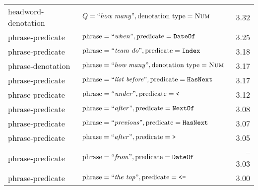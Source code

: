 \begin{tabular}{llr}
headword-denotation & $Q = \text{``\emph{how many}''}, \text{denotation type} = \textsc{Num}$ & 3.32 \\
phrase-predicate & $\text{phrase} = \text{``\emph{when}''}, \text{predicate} = {\texttt{Date}}\texttt{Of}$ & 3.25 \\
phrase-predicate & $\text{phrase} = \text{``\emph{team do}''}, \text{predicate} = \texttt{Index}$ & 3.18 \\
phrase-denotation & $\text{phrase} = \text{``\emph{how many}''}, \text{denotation type} = \textsc{Num}$ & 3.17 \\
phrase-predicate & $\text{phrase} = \text{``\emph{list before}''}, \text{predicate} = \texttt{Has}{\texttt{Next}}$ & 3.17 \\
phrase-predicate & $\text{phrase} = \text{``\emph{under}''}, \text{predicate} = \texttt{<}$ & 3.12 \\
phrase-predicate & $\text{phrase} = \text{``\emph{after}''}, \text{predicate} = {\texttt{Next}}\texttt{Of}$ & 3.08 \\
phrase-predicate & $\text{phrase} = \text{``\emph{previous}''}, \text{predicate} = \texttt{Has}{\texttt{Next}}$ & 3.07 \\
phrase-predicate & $\text{phrase} = \text{``\emph{after}''}, \text{predicate} = \texttt{>}$ & 3.05 \\
phrase-predicate & $\text{phrase} = \text{``\emph{from}''}, \text{predicate} = {\texttt{Date}}\texttt{Of}$ & --3.03 \\
phrase-predicate & $\text{phrase} = \text{``\emph{the top}''}, \text{predicate} = \texttt{<=}$ & 3.00 \\
\bottomrule
\end{tabular}
